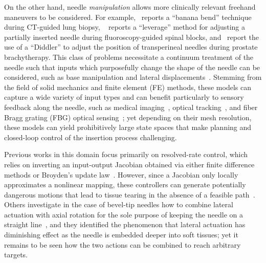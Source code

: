 On the other hand, needle \textit{manipulation} allows more clinically relevant freehand maneuvers to be considered. For example,~\parencite{bourgouinImageGuidedPercutaneousLung2021} reports a ``banana bend'' technique during CT-guided lung biopsy, ~\parencite{kimConsiderationsFluoroscopicGuided2020} reports a ``leverage'' method for adjusting a partially inserted needle during fluoroscopy-guided spinal blocks, and~\parencite{shanahanComparisonPermanentProstate2002,bernardesDataDrivenAdaptiveNeedle2023} report the use of a ``Diddler'' to adjust the position of transperineal needles during prostate brachytherapy. This class of problems necessitate a continuum treatment of the needle such that inputs which purposefully change the shape of the needle can be considered, such as base manipulation and lateral displacements~\parencite{dimaioNeedleSteeringMotion2005, glozmanImageGuidedRoboticFlexible2007,lehmannDeflectionModelingNeedle2017, adagolodjoRoboticInsertionFlexible2019,wangSituFlexibleNeedle2023,wangSimulationbasedFlexibleNeedle2024, wangShapeManipulationBevelTip2024}. Stemming from the field of solid mechanics and finite element (FE) methods, these models can capture a wide variety of input types and can benefit particularly to sensory feedback along the needle, such as medical imaging~\parencite{glozmanImageGuidedRoboticFlexible2007}, optical tracking~\parencite{adagolodjoRoboticInsertionFlexible2019}, and fiber Bragg grating (FBG) optical sensing~\parencite{wangSimulationbasedFlexibleNeedle2024}; yet depending on their mesh resolution, these models can yield prohibitively large state spaces that make planning and closed-loop control of the insertion process challenging.

Previous works in this domain focus primarily on resolved-rate control, which relies on inverting an input-output Jacobian obtained via either finite difference methods or Broyden's update law~\parencite{dimaioNeedleSteeringMotion2005, adagolodjoRoboticInsertionFlexible2019,bernardesDataDrivenAdaptiveNeedle2023,wangSituFlexibleNeedle2023,wangSimulationbasedFlexibleNeedle2024,wangShapeManipulationBevelTip2024}. However, since a Jacobian only locally approximates a nonlinear mapping, these controllers can generate potentially dangerous motions that lead to tissue tearing in the absence of a feasible path~\parencite{wangShapeManipulationBevelTip2024}. Others investigate in the case of bevel-tip needles how to combine lateral actuation with axial rotation for the sole purpose of keeping the needle on a straight line~\parencite{lehmannDeflectionModelingNeedle2017}, and they identified the phenomenon that lateral actuation has diminishing effect as the needle is embedded deeper into soft tissues; yet it remains to be seen how the two actions can be combined to reach arbitrary targets.

